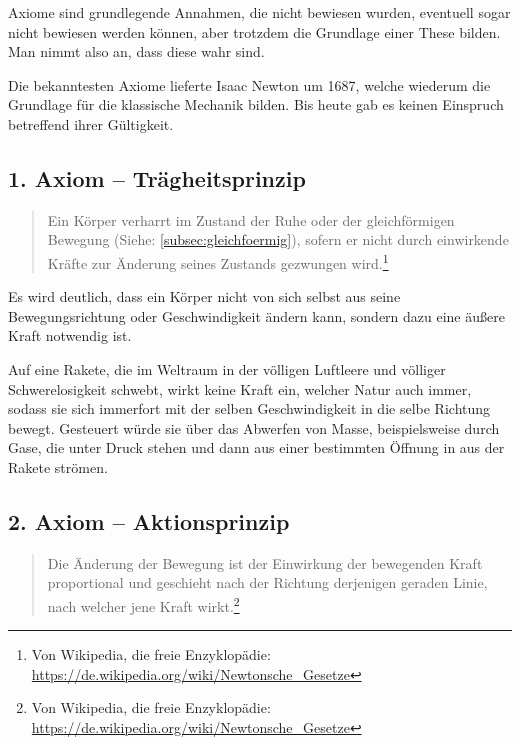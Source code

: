 Axiome sind grundlegende Annahmen, die nicht bewiesen wurden, eventuell sogar nicht bewiesen werden können, aber trotzdem die Grundlage einer These bilden. Man nimmt also an, dass diese wahr sind.

Die bekanntesten Axiome lieferte Isaac Newton um 1687, welche wiederum die Grundlage für die klassische Mechanik bilden. Bis heute gab es keinen Einspruch betreffend ihrer Gültigkeit.

\subsection{1. Axiom -- Trägheitsprinzip}

\begin{quote}
\glqq Ein Körper verharrt im Zustand der Ruhe oder der gleichförmigen Bewegung (Siehe: \ref{subsec:gleichfoermig}), sofern er nicht durch einwirkende Kräfte zur Änderung seines Zustands gezwungen wird.\grqq \footnote{Von Wikipedia, die freie Enzyklopädie: \url{https://de.wikipedia.org/wiki/Newtonsche_Gesetze}}
\end{quote}

\noindent Es wird deutlich, dass ein Körper nicht von sich selbst aus seine Bewegungsrichtung oder Geschwindigkeit ändern kann, sondern dazu eine äußere Kraft notwendig ist.

\begin{Beispiel}
	Auf eine Rakete, die im Weltraum in der völligen Luftleere und völliger Schwerelosigkeit schwebt, wirkt keine Kraft ein, welcher Natur auch immer, sodass sie sich immerfort mit der selben Geschwindigkeit in die selbe Richtung bewegt. Gesteuert würde sie über das \glqq Abwerfen\grqq{} von Masse, beispielsweise durch Gase, die unter Druck stehen und dann aus einer bestimmten Öffnung in aus der Rakete strömen.
\end{Beispiel}


\subsection{2. Axiom -- Aktionsprinzip}

\begin{quote}
\glqq Die Änderung der Bewegung ist der Einwirkung der bewegenden Kraft proportional und geschieht nach der Richtung derjenigen geraden Linie, nach welcher jene Kraft wirkt.\grqq \footnote{Von Wikipedia, die freie Enzyklopädie: \url{https://de.wikipedia.org/wiki/Newtonsche_Gesetze}}
\end{quote}

